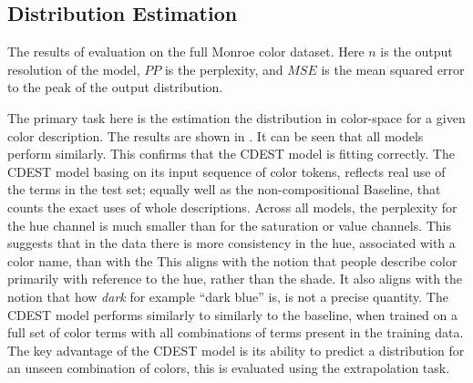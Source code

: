 \documentclass[11pt,letterpaper]{article}
\begin{document}
\subsection{Distribution Estimation}

\begin{table*}
	\centering
	\caption{\label{tblresfull} The results of evaluation on the full Monroe color dataset. Here $n$ is the output resolution of the model, $PP$ is the perplexity, and $MSE$ is the mean squared error to the peak of the output distribution.}
\end{table*}

The primary task here is the estimation the distribution in color-space for a given color description.
The results are shown in .
It can be seen that all models perform similarly.
This confirms that the CDEST model is fitting correctly.
The CDEST model basing on its input sequence of color tokens,
reflects real use of the terms in the test set; 
equally well as the non-compositional Baseline, that counts the exact uses of whole descriptions.
Across all models, the perplexity for the hue channel is much smaller than for the saturation or value channels.
This suggests that in the data there is more consistency in the hue, associated with a color name, than with the 
This aligns with the notion that people describe color primarily with reference to the hue, rather than the shade.
It also aligns with the notion that how \emph{dark} for example ``dark blue'' is, is not a precise quantity.
The CDEST model performs similarly to similarly to the baseline, when trained on a full set of color terms with all combinations of terms present in the training data.
The key advantage of the CDEST model is its ability to predict a distribution for an unseen combination of colors, this is evaluated using the extrapolation task.
\end{document}
